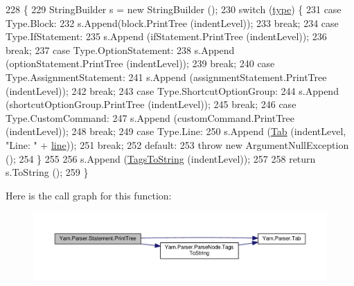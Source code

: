 \begin{DoxyCode}
228             \{
229                 StringBuilder s = \textcolor{keyword}{new} StringBuilder ();
230                 \textcolor{keywordflow}{switch} (\hyperlink{a00168_aa3fa0eb260e412720562ce06b7dc06fe}{type}) \{
231                 \textcolor{keywordflow}{case} Type.Block:
232                     s.Append(block.PrintTree (indentLevel));
233                     \textcolor{keywordflow}{break};
234                 \textcolor{keywordflow}{case} Type.IfStatement:
235                     s.Append (ifStatement.PrintTree (indentLevel));
236                     \textcolor{keywordflow}{break};
237                 \textcolor{keywordflow}{case} Type.OptionStatement:
238                     s.Append (optionStatement.PrintTree (indentLevel));
239                     \textcolor{keywordflow}{break};
240                 \textcolor{keywordflow}{case} Type.AssignmentStatement:
241                     s.Append (assignmentStatement.PrintTree (indentLevel));
242                     \textcolor{keywordflow}{break};
243                 \textcolor{keywordflow}{case} Type.ShortcutOptionGroup:
244                     s.Append (shortcutOptionGroup.PrintTree (indentLevel));
245                     \textcolor{keywordflow}{break};
246                 \textcolor{keywordflow}{case} Type.CustomCommand:
247                     s.Append (customCommand.PrintTree (indentLevel));
248                     \textcolor{keywordflow}{break};
249                 \textcolor{keywordflow}{case} Type.Line:
250                     s.Append (\hyperlink{a00151_aa8fa36b46de12a1c561d77b99c4b9ae3}{Tab} (indentLevel, \textcolor{stringliteral}{"Line: "} + \hyperlink{a00168_a37695c7b00776bb292fd64894a70fb72}{line}));
251                     \textcolor{keywordflow}{break};
252                 \textcolor{keywordflow}{default}:
253                     \textcolor{keywordflow}{throw} \textcolor{keyword}{new} ArgumentNullException ();
254                 \}
255 
256                 s.Append (\hyperlink{a00150_a054f36c80d5eeacd569a8859f599af67}{TagsToString} (indentLevel));
257 
258                 \textcolor{keywordflow}{return} s.ToString ();
259             \}
\end{DoxyCode}


Here is the call graph for this function\-:
\nopagebreak
\begin{figure}[H]
\begin{center}
\leavevmode
\includegraphics[width=350pt]{a00168_aaac6d1e0c3b31f33e1c6f964c205153e_cgraph}
\end{center}
\end{figure}


